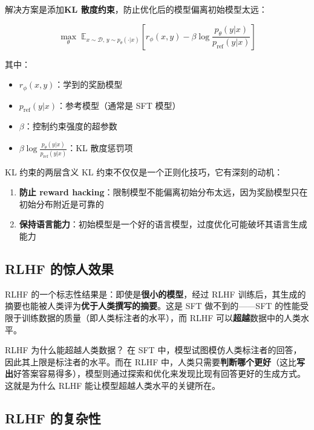 \documentclass[a4paper]{article}
\begin{document}
解决方案是添加\textbf{KL 散度约束}，防止优化后的模型偏离初始模型太远：

$$\max_\theta \; \mathbb{E}_{x \sim \mathcal{D}, \, y \sim p_\theta(\cdot|x)} \left[ r_\phi(x, y) - \beta \log \frac{p_\theta(y|x)}{p_{\text{ref}}(y|x)} \right]$$

其中：
\begin{itemize}
    \item $r_\phi(x, y)$：学到的奖励模型
    \item $p_{\text{ref}}(y|x)$：参考模型（通常是 SFT 模型）
    \item $\beta$：控制约束强度的超参数
    \item $\beta \log \frac{p_\theta(y|x)}{p_{\text{ref}}(y|x)}$：KL 散度惩罚项
\end{itemize}

\begin{knowledgebox}{KL 约束的两层含义}
KL 约束不仅仅是一个正则化技巧，它有深刻的动机：
\begin{enumerate}
    \item \textbf{防止 reward hacking}：限制模型不能偏离初始分布太远，因为奖励模型只在初始分布附近是可靠的
    \item \textbf{保持语言能力}：初始模型是一个好的语言模型，过度优化可能破坏其语言生成能力
\end{enumerate}
\end{knowledgebox}

\subsection{RLHF 的惊人效果}





RLHF 的一个标志性结果是：即使是\textbf{很小的模型}，经过 RLHF 训练后，其生成的摘要也能被人类评为\textbf{优于人类撰写的摘要}。这是 SFT 做不到的——SFT 的性能受限于训练数据的质量（即人类标注者的水平），而 RLHF 可以\textbf{超越}数据中的人类水平。

\begin{importantbox}{RLHF 为什么能超越人类数据？}
在 SFT 中，模型试图模仿人类标注者的回答，因此其上限是标注者的水平。而在 RLHF 中，人类只需要\textbf{判断哪个更好}（这比\textbf{写出}好答案容易得多），模型则通过探索和优化来发现比现有回答更好的生成方式。这就是为什么 RLHF 能让模型超越人类水平的关键所在。
\end{importantbox}

\subsection{RLHF 的复杂性}
\end{document}
